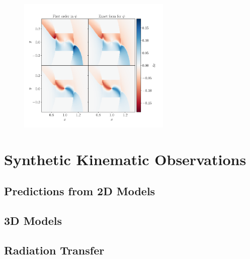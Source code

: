 \begin{figure}[H]
    \centering
    \includegraphics[width = 0.65\textwidth]{figures/2_0_mth.pdf}
    \caption{}
    \label{fig:2_0mth}
\end{figure}

\section{Synthetic Kinematic Observations}

\subsection{Predictions from 2D Models}

\subsection{3D Models}

\subsection{Radiation Transfer}